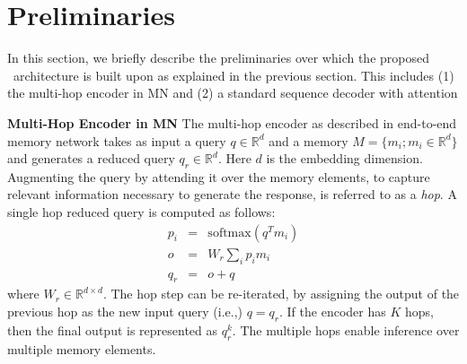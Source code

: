 \section{Preliminaries}
\label{sec:prelims}
In this section, we briefly describe the preliminaries over which the proposed \sys\ architecture is built upon as explained in the previous section. This includes (1) the multi-hop encoder in MN and (2) a standard sequence decoder with attention \cite{bahdanau2014neural}

\noindent\textbf{Multi-Hop Encoder in MN}
\label{ssec:mhencoder}
The multi-hop encoder as described in end-to-end memory network \cite{sukhbaatar2015end} takes as input a query $q \in \mathbb{R}^{d}$ and a memory $M = \{ m_i; m_i \in \mathbb{R}^{d}\}$ and generates a reduced query $q_r \in \mathbb{R}^{d}$. Here $d$ is the embedding dimension. Augmenting the query by attending it over the memory elements, to capture relevant information necessary to generate the response, is referred to as a \textit{hop}. A single hop reduced query is computed as follows:
\begin{eqnarray}
p_i &=& \text{softmax}(q^T m_i) \\
o &=& W_r \sum\nolimits_i p_i m_i \\
q_r &=& o + q
\end{eqnarray}
where $W_r \in \mathbb{R}^{d \times d}$. The hop step can be re-iterated, by assigning the output of the previous hop as the new input query (i.e.,) $q=q_r$. If the encoder has $K$ hops, then the final output is represented as $q^k_r$. The multiple hops enable inference over multiple memory elements.

